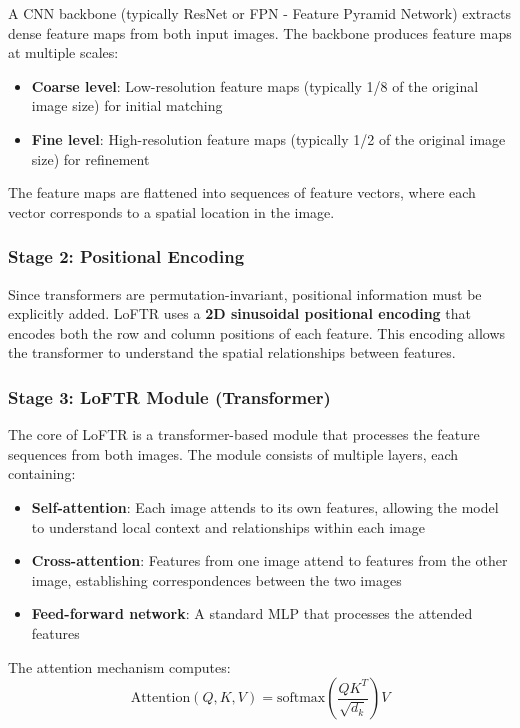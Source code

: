\documentclass[11pt,a4paper]{article}
\theoremstyle{definition}
\theoremstyle{plain}
\theoremstyle{remark}
\begin{document}
A CNN backbone (typically ResNet or FPN - Feature Pyramid Network) extracts dense feature maps from both input images. The backbone produces feature maps at multiple scales:
\begin{itemize}
    \item \textbf{Coarse level}: Low-resolution feature maps (typically 1/8 of the original image size) for initial matching
    \item \textbf{Fine level}: High-resolution feature maps (typically 1/2 of the original image size) for refinement
\end{itemize}

The feature maps are flattened into sequences of feature vectors, where each vector corresponds to a spatial location in the image.

\subsubsection{Stage 2: Positional Encoding}

Since transformers are permutation-invariant, positional information must be explicitly added. 
LoFTR uses a \textbf{2D sinusoidal positional encoding} that encodes both the row and column positions of each feature.
This encoding allows the transformer to understand the spatial relationships between features.

\subsubsection{Stage 3: LoFTR Module (Transformer)}

The core of LoFTR is a transformer-based module that processes the feature sequences from both images. The module consists of multiple layers, each containing:

\begin{itemize}
    \item \textbf{Self-attention}: Each image attends to its own features, allowing the model to understand local context and relationships within each image
    \item \textbf{Cross-attention}: Features from one image attend to features from the other image, establishing correspondences between the two images
    \item \textbf{Feed-forward network}: A standard MLP that processes the attended features
\end{itemize}

The attention mechanism computes:
\[
\text{Attention}(Q, K, V) = \text{softmax}\left(\frac{QK^T}{\sqrt{d_k}}\right)V
\]
\end{document}
